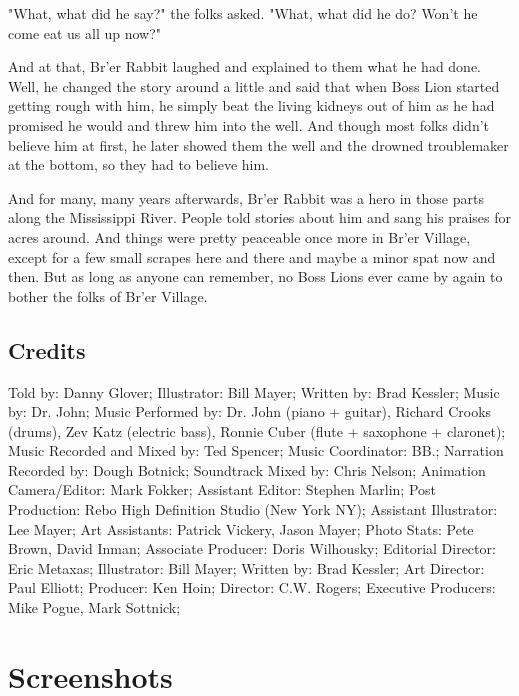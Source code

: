 "What, what did he say?" the folks asked. "What, what did he do? Won't he come eat us all up now?"

And at that, Br'er Rabbit laughed and explained to them what he had done. Well, he changed the story around a little and said that when Boss Lion started getting rough with him, he simply beat the living kidneys out of him as he had promised he would and threw him into the well. And though most folks didn't believe him at first, he later showed them the well and the drowned troublemaker at the bottom, so they had to believe him.

And for many, many years afterwards, Br'er Rabbit was a hero in those parts along the Mississippi River. People told stories about him and sang his praises for acres around. And things were pretty peaceable once more in Br'er Village, except for a few small scrapes here and there and maybe a minor spat now and then. But as long as anyone can remember, no Boss Lions ever came by again to bother the folks of Br'er Village.

\subsection{Credits}

Told by: Danny Glover;
Illustrator: Bill Mayer;
Written by: Brad Kessler;
Music by: Dr. John;
Music Performed by: Dr. John (piano + guitar), Richard Crooks (drums), Zev Katz (electric bass), Ronnie Cuber (flute + saxophone + claronet);
Music Recorded and Mixed by: Ted Spencer;
Music Coordinator: BB.;
Narration Recorded by: Dough Botnick;
Soundtrack Mixed by: Chris Nelson;
Animation Camera/Editor: Mark Fokker;
Assistant Editor: Stephen Marlin;
Post Production: Rebo High Definition Studio (New York NY);
Assistant Illustrator: Lee Mayer;
Art Assistants: Patrick Vickery, Jason Mayer;
Photo Stats: Pete Brown, David Inman;
Associate Producer: Doris Wilhousky;
Editorial Director: Eric Metaxas;
Illustrator: Bill Mayer;
Written by: Brad Kessler;
Art Director: Paul Elliott;
Producer: Ken Hoin;
Director: C.W. Rogers;
Executive Producers: Mike Pogue, Mark Sottnick;

\clearpage
\newpage

\section{Screenshots}

